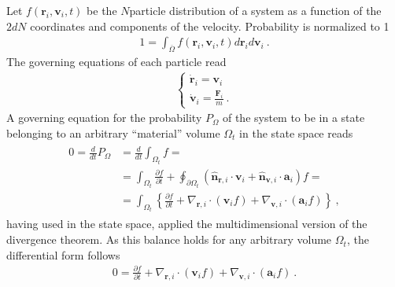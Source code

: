 \documentclass[letterpaper,10pt,english]{jupyterBook}
\begin{document}
\sphinxAtStartPar
Let \(f(\mathbf{r}_i, \mathbf{v}_i, t)\) be the \(N\)\sphinxhyphen{}particle distribution of a system as a function of the \(2 d N\) coordinates and components of the velocity. Probability is normalized to 1
\begin{equation*}
\begin{split}1 = \int_{\overline{\Omega}} f(\mathbf{r}_i, \mathbf{v}_i, t) d \mathbf{r}_i d \mathbf{v}_i \ .\end{split}
\end{equation*}
\sphinxAtStartPar
The governing equations of each particle read
\begin{equation*}
\begin{split}\begin{cases}
  \dot{\mathbf{r}}_i = \mathbf{v}_i \\
  \dot{\mathbf{v}}_i = \frac{\mathbf{F}_i}{m} \ .
\end{cases}\end{split}
\end{equation*}
\sphinxAtStartPar
A governing equation for the probability \(P_{\Omega}\) of the system to be in a state belonging to an arbitrary “material” volume \(\Omega_t\) in the state space reads
\begin{equation*}
\begin{split}\begin{aligned}
  0 = \frac{d}{dt} P_{\Omega} 
  & = \frac{d}{dt} \int_{\Omega_t} f = \\
  & = \int_{\Omega_t} \frac{\partial f}{\partial t} + \oint_{\partial \Omega_t} \left( \hat{\mathbf{n}}_{\mathbf{r},i} \cdot \mathbf{v}_i + \hat{\mathbf{n}}_{\mathbf{v},i} \cdot \mathbf{a}_i \right) f = \\
  & = \int_{\Omega_t} \left\{ \frac{\partial f}{\partial t} + \nabla_{\mathbf{r},i} \cdot \left( \mathbf{v}_i f \right) + \nabla_{\mathbf{v},i} \cdot \left( \mathbf{a}_i f \right) \right\} \ ,
\end{aligned}\end{split}
\end{equation*}
\sphinxAtStartPar
having used  in the state space, applied the multi\sphinxhyphen{}dimensional version of the divergence theorem. As this balance holds for any arbitrary volume \(\Omega_t\), the differential form follows
\begin{equation*}
\begin{split}
0 = \frac{\partial f}{\partial t} + \nabla_{\mathbf{r},i} \cdot \left( \mathbf{v}_i f \right) + \nabla_{\mathbf{v},i} \cdot \left( \mathbf{a}_i f \right) \ .
\end{split}
\end{equation*}
\end{document}
